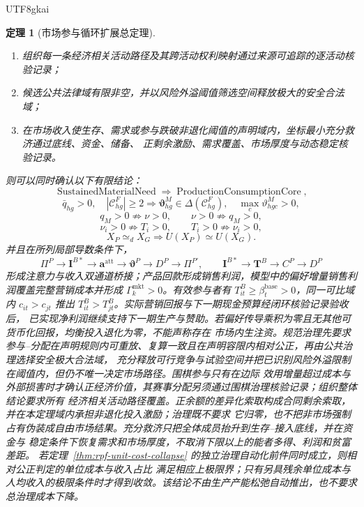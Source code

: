 \documentclass[12pt,a4paper,openany]{report}
\newtheorem{theorem}{定理}[chapter]
\begin{document}
\begin{CJK*}{UTF8}{gkai}
\begin{theorem}[市场参与循环扩展总定理]
\begin{enumerate}[label=\textnormal{M\arabic*:},leftmargin=3.5em]
  规范治理的相对公正核验记录分开；正投入另满足命题~\ref{prop:residual-share-positive-effort}
  的充分条件，或提交其他具有参与约束的正投入均衡；
  \item 组织每一条经济相关活动路径及其跨活动权利映射通过来源可追踪的逐活动核验记录；
  \item 候选公共法律域有限非空，并以风险外溢阈值筛选空间释放极大的安全合法域；
  \item 在市场收入使生存、需求或参与跌破非退化阈值的声明域内，坐标最小充分救济通过底线、资金、储备、
  正剩余激励、需求覆盖、市场厚度与动态稳定核验记录。
\end{enumerate}
则可以同时确认以下有限结论：
\[
  \operatorname{SustainedMaterialNeed}
  \Longrightarrow
  \operatorname{ProductionConsumptionCore},
\]
\[
  \bar q_{hg}>0,
  \quad |\mathcal C_{hg}^{F}|\ge2
  \Longrightarrow
  \boldsymbol\vartheta_{hg}^{M}\in
  \Delta(\mathcal C_{hg}^{F}),
  \quad \max_c\vartheta_{hgc}^{M}>0,
\]
\[
  q_M>0\not\Longrightarrow\nu>0,
  \qquad
  \nu>0\not\Longrightarrow q_M>0,
\]
\[
  \nu_i>0\not\Longrightarrow T_i>0,
  \qquad
  T_i>0\not\Longrightarrow\nu_i>0,
\]
\[
  X_P\simeq_dX_G
  \Longrightarrow
  U(X_P)\simeq U(X_G).
\]
并且在所列局部导数条件下，
\[
  \Pi^P\to\mathbf I^{B*}\to\mathbf a^{\mathrm{att}}
  \to\boldsymbol\vartheta^P\to D^P\to\Pi^{P\prime},
  \qquad
  \mathbf I^{B*}\to\mathbf T^B\to C^P\to D^P
\]
形成注意力与收入双通道桥接；产品回款形成销售利润，模型中的偏好增量销售利润覆盖完整营销成本并形成
\(\Gamma_k^{\mathrm{mkt}}>0\)。有效参与者有 \(T_{it}^B\ge\beta_t^{\mathrm{base}}>0\)，同一可比域内
\(c_{it}>c_{jt}\) 推出 \(T_{it}^B>T_{jt}^B\)。实际营销回报与下一期现金预算经闭环核验记录验收后，
已实现净利润继续支持下一期生产与赞助。若偏好传导乘积为零且无其他可货币化回报，均衡投入退化为零，不能声称存在
市场内生注资。规范治理先要求参与--分配在声明规则内可重放、复算一致且在声明容限内相对公正，再由公共治理选择安全极大合法域，
充分释放可行竞争与试验空间并把已识别风险外溢限制在阈值内，但仍不唯一决定市场路径。围棋参与只有在边际
效用增量超过成本与外部损害时才确认正经济价值，其赛事分配另须通过围棋治理核验记录；组织整体结论要求所有
经济相关活动路径覆盖。正余额的差异化索取构成合同剩余索取，并在本定理域内承担非退化投入激励；治理既不要求
它归零，也不把非市场强制占有伪装成自由市场结果。充分救济只把全体成员抬升到生存--接入底线，并在资金与
稳定条件下恢复需求和市场厚度，不取消下限以上的能者多得、利润和贫富差距。
若定理~\ref{thm:rpf-unit-cost-collapse} 的独立治理自动化前件同时成立，则相对公正判定的单位成本与收入占比
满足相应上极限界；只有另具残余单位成本与人均收入的极限条件时才得到收敛。该结论不由生产产能松弛自动推出，也不要求总治理成本下降。
\end{theorem}


\end{CJK*}
\end{document}

